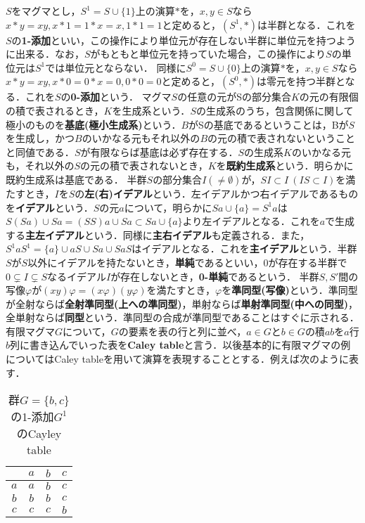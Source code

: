 $S$をマグマとし，$S^1=S\cup\{1\}$上の演算$*$を，$x,y\in S$なら$x*y=xy, x*1=1*x=x, 1*1=1$と定めると，$(S^1,*)$は半群となる．これを$S$の{\bf 1-添加}といい，この操作により単位元が存在しない半群に単位元を持つように出来る．なお，$S$がもともと単位元を持っていた場合，この操作により$S$の単位元は$S^1$では単位元とならない．
同様に$S^0=S\cup\{0\}$上の演算$*$を，$x,y\in S$なら$x*y=xy, x*0=0*x=0, 0*0=0$と定めると，$(S^0,*)$は零元を持つ半群となる．これを$S$の{\bf 0-添加}という．
マグマ$S$の任意の元がSの部分集合$K$の元の有限個の積で表されるとき，$K$を生成系という．$S$の生成系のうち，包含関係に関して極小のものを{\bf 基底(極小生成系)}という．$B$がSの基底であるということは，Bが$S$を生成し，かつ$B$のいかなる元もそれ以外の$B$の元の積で表されないということと同値である．$S$が有限ならば基底は必ず存在する．$S$の生成系$K$のいかなる元も，それ以外の$S$の元の積で表されないとき，$K$を{\bf 既約生成系}という．明らかに既約生成系は基底である．
半群$S$の部分集合$I(\neq\emptyset)$が，$SI\subset I\:(IS\subset I)$を満たすとき，$I$を$S$の{\bf 左(右)イデアル}という．左イデアルかつ右イデアルであるものを{\bf イデアル}という．$S$の元$a$について，明らかに$Sa\cup\{a\}=S^1a$は$S(Sa)\cup Sa=(SS)a\cup Sa\subset Sa\cup\{a\}$より左イデアルとなる．これを$a$で生成する{\bf 主左イデアル}という．同様に{\bf 主右イデアル}も定義される．また，$S^1aS^1=\{a\}\cup aS\cup Sa\cup SaS$はイデアルとなる．これを{\bf 主イデアル}という．半群$S$が$S$以外にイデアルを持たないとき，{\bf 単純}であるといい，$0$が存在する半群で$0\subsetneq I\subsetneq S$なるイデアル$I$が存在しないとき，{\bf 0-単純}であるという．
半群$S,S'$間の写像$\varphi$が$(xy)\varphi=(x\varphi)(y\varphi)$を満たすとき，$\varphi$を{\bf 準同型(写像)}という．準同型が全射ならば{\bf 全射準同型(上への準同型)}，単射ならば{\bf 単射準同型(中への同型)}，全単射ならば{\bf 同型}という．準同型の合成が準同型であることはすぐに示される．
有限マグマ$G$について，$G$の要素を表の行と列に並べ，$a\in G$と$b\in G$の積$ab$を$a$行$b$列に書き込んでいった表を{\bf Caley table}と言う．以後基本的に有限マグマの例についてはCaley tableを用いて演算を表現することとする．例えば次のように表す．
\begin{table}[htb]
\begin{center}
\begin{tabular}{c|ccc}
 &$a$&$b$&$c$ \\ \hline
$a$&$a$&$b$&$c$ \\
$b$&$b$&$b$&$c$ \\
$c$&$c$&$c$&$b$    
\end{tabular}
\caption{群$G=\{b,c\}$の1-添加$G^1$のCayley table}
\end{center}
\end{table}
